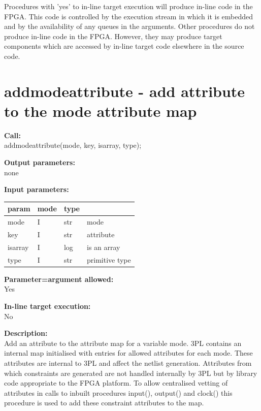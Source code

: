     Procedures with 'yes' to in-line target execution will produce in-line
    code in the FPGA. This code is controlled by the execution stream in which
    it is embedded and by the availability of any queues in the arguments.
    Other procedures do not produce in-line code in the FPGA. However, they may 
    produce target components which are accessed by in-line target code
    elsewhere in the source code.
        


    \section{addmodeattribute - add attribute to the mode attribute map}\label{sec:ipaddmodeatt}
        
        {\bf Call:} \\
        addmodeattribute(mode, key, isarray, type);
        
        {\bf Output parameters:} \\
        none
        
        {\bf Input parameters:} \\
        \begin{tabular}{| l | l | l | l |}
        \hline
        param  & mode & type & \\
        \hline \hline
        mode    & I & str & mode           \\ \hline
        key     & I & str & attribute      \\ \hline
        isarray & I & log & is an array    \\ \hline
        type    & I & str & primitive type \\ \hline
        \end{tabular}
        
        {\bf Parameter=argument allowed:} \\
        Yes
        
        {\bf In-line target execution:} \\
        No
        
        {\bf Description:} \\
        Add an attribute to the attribute map for a variable mode. 3PL contains
        an internal map initialised with entries for allowed attributes for each
        mode. These attributes are internal to 3PL and affect the netlist
        generation. Attributes from which constraints are generated are not
        handled internally by 3PL but by library code appropriate to the FPGA
        platform. To allow centralised vetting of attributes in calls to inbuilt
        procedures input(), output() and clock() this procedure is used to add
        these constraint attributes to the map.
        
